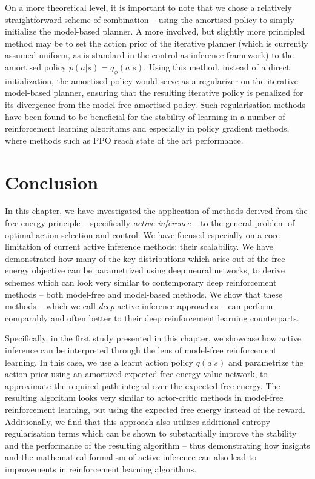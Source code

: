 On a more theoretical level, it is important to note that we chose a relatively straightforward scheme of combination -- using the amortised policy to simply initialize the model-based planner. A more involved, but slightly more principled method may be to set the action prior of the iterative planner (which is currently assumed uniform, as is standard in the control as inference framework) to the amortised policy $p(a | s) = q_\phi(a | s)$. Using this method, instead of a direct initialization, the amortised policy would serve as a regularizer on the iterative model-based planner, ensuring that the resulting iterative policy is penalized for its divergence from the model-free amortised policy. Such regularisation methods have been found to be beneficial for the stability of learning in a number of reinforcement learning algorithms and especially in policy gradient methods, where methods such as PPO \citep{schulman2017proximal} reach state of the art performance.

\section{Conclusion}

In this chapter, we have investigated the application of methods derived from the free energy principle -- specifically \emph{active inference} -- to the general problem of optimal action selection and control. We have focused especially on a core limitation of current active inference methods: their scalability. We have demonstrated how many of the key distributions which arise out of the free energy objective can be parametrized using deep neural networks, to derive schemes which can look very similar to contemporary deep reinforcement methods -- both model-free and model-based methods. We show that these methods -- which we call \emph{deep} active inference approaches -- can perform comparably and often better to their deep reinforcement learning counterparts. 

Specifically, in the first study presented in this chapter, we showcase how active inference can be interpreted through the lens of model-free reinforcement learning. In this case, we use a learnt action policy $q(a | s)$ and parametrize the action prior using an amortized expected-free energy value network, to approximate the required path integral over the expected free energy. The resulting algorithm looks very similar to actor-critic methods in model-free reinforcement learning, but using the expected free energy instead of the reward. Additionally, we find that this approach also utilizes additional entropy regularisation terms which can be shown to substantially improve the stability and the performance of the resulting algorithm -- thus demonstrating how insights and the mathematical formalism of active inference can also lead to improvements in reinforcement learning algorithms.

